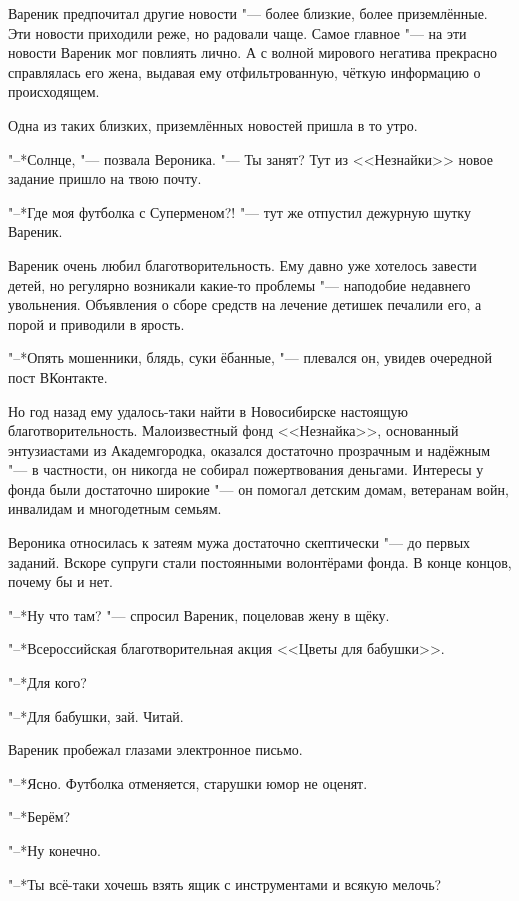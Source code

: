 Вареник предпочитал другие новости "--- более близкие, более приземлённые.
Эти новости приходили реже, но радовали чаще.
Самое главное "--- на эти новости Вареник мог повлиять лично.
А с волной мирового негатива прекрасно справлялась его жена, выдавая ему отфильтрованную, чёткую информацию о происходящем.

Одна из таких близких, приземлённых новостей пришла в то утро.

"--*Солнце, "--- позвала Вероника.
"--- Ты занят?
Тут из <<Незнайки>> новое задание пришло на твою почту.

"--*Где моя футболка с Суперменом?! "--- тут же отпустил дежурную шутку Вареник.

Вареник очень любил благотворительность.
Ему давно уже хотелось завести детей, но регулярно возникали какие-то проблемы "--- наподобие недавнего увольнения.
Объявления о сборе средств на лечение детишек печалили его, а порой и приводили в ярость.

"--*Опять мошенники, блядь, суки ёбанные, "--- плевался он, увидев очередной пост ВКонтакте.

Но год назад ему удалось-таки найти в Новосибирске настоящую благотворительность.
Малоизвестный фонд <<Незнайка>>, основанный энтузиастами из Академгородка, оказался достаточно прозрачным и надёжным "--- в частности, он никогда не собирал пожертвования деньгами.
Интересы у фонда были достаточно широкие "--- он помогал детским домам, ветеранам войн, инвалидам и многодетным семьям.

Вероника относилась к затеям мужа достаточно скептически "--- до первых заданий.
Вскоре супруги стали постоянными волонтёрами фонда.
В конце концов, почему бы и нет.

"--*Ну что там? "--- спросил Вареник, поцеловав жену в щёку.

"--*Всероссийская благотворительная акция <<Цветы для бабушки>>.

"--*Для кого?

"--*Для бабушки, зай.
Читай.

Вареник пробежал глазами электронное письмо.

"--*Ясно.
Футболка отменяется, старушки юмор не оценят.

"--*Берём?

"--*Ну конечно.

\asterism

\textspace

"--*Ты всё-таки хочешь взять ящик с инструментами и всякую мелочь?

